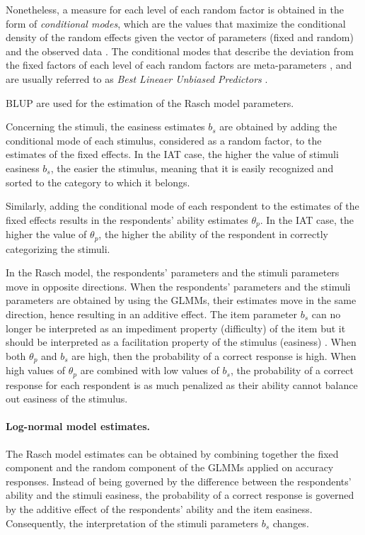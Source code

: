 \documentclass[12pt]{book}
\begin{document}
Nonetheless, a measure for each level of each random factor is obtained in the form of \emph{conditional modes}, which are the values that maximize the conditional density of the random effects given the vector of parameters (fixed and random) and the observed data \cite{Doran2007}. 
The conditional modes that describe the deviation from the fixed factors of each level of each random factors are meta-parameters \cite{pastore}, and are usually referred to as \emph{Best Lineaer Unbiased Predictors} \cite<BLUP,>{pinheiro2006}. 

BLUP are used for the estimation of the Rasch model parameters. 

Concerning the stimuli, the easiness estimates $b_s$ are obtained by adding the conditional mode of each stimulus, considered as a random factor, to the estimates of the fixed effects. 
In the IAT case, the higher the value of stimuli easiness $b_s$, the easier the stimulus, meaning that it is easily recognized and sorted to the category to which it belongs.  

Similarly, adding the conditional mode of each respondent to the estimates of the fixed effects results in the  respondents' ability estimates $\theta_p$. 
In the IAT case, the higher the value of $\theta_p$, the higher the ability of the respondent in correctly categorizing the stimuli. 

In the Rasch model,  the respondents' parameters and the stimuli parameters move in opposite directions. 
When the respondents' parameters and the stimuli parameters are obtained by using the GLMMs, their estimates move in the same direction, hence resulting in an additive effect.
The item parameter $b_s$ can no longer be interpreted as an impediment property (difficulty) of the item but it should be interpreted as a facilitation property of the stimulus (easiness) \cite{DeBoeck2011, Doran2007}. 
When both $\theta_p$ and $b_s$ are high, then the probability of a correct response is high. 
When high values of $\theta_p$ are combined with low values of $b_s$, the probability of a correct response for each respondent is as much penalized as their ability cannot balance out easiness of the stimulus. 

\paragraph{Log-normal model estimates.}

The Rasch model estimates can be obtained by combining together the fixed component and the random component of the GLMMs applied on accuracy responses. 
Instead of being governed by the difference between the respondents' ability and the stimuli easiness, the probability of a correct response is governed by the additive effect of the respondents' ability and the item easiness. Consequently, the interpretation of the stimuli parameters $b_s$ changes.
\end{document}
